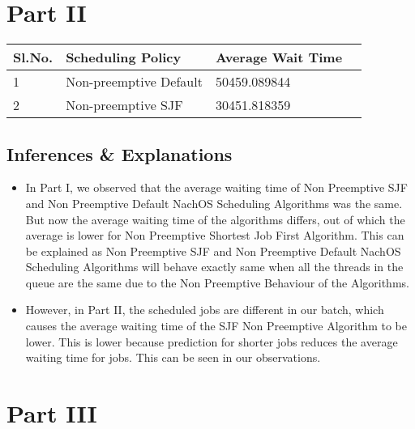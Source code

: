 \documentclass{article}
\begin{document}
\section{Part II}
\begin{center}
    \begin{tabular}{| l | l | l | l |}
    \hline
    Sl.No. & Scheduling Policy & Average Wait Time \\ \hline
    1 & Non-preemptive Default & 50459.089844 \\
    2 & Non-preemptive SJF & 30451.818359 \\
    \hline
    \end{tabular}
\end{center}
\subsection{Inferences \& Explanations}
\begin{itemize}
\item In Part I, we observed that the average waiting time of Non Preemptive SJF and Non Preemptive Default NachOS Scheduling Algorithms was the same. But now the average waiting time of the algorithms differs, out of which the average is lower for Non Preemptive Shortest Job First Algorithm. This can be explained as Non Preemptive SJF and Non Preemptive Default NachOS Scheduling Algorithms will behave exactly same when all the threads in the queue are the same due to the Non Preemptive Behaviour of the Algorithms.  
\item However, in Part II, the scheduled jobs are different in our batch, which causes the average waiting time of the  SJF Non Preemptive Algorithm to be lower. This is lower because prediction for shorter jobs reduces the average waiting time for jobs. This can be seen in our observations. 
\end{itemize}

\section{Part III}
\end{document}
